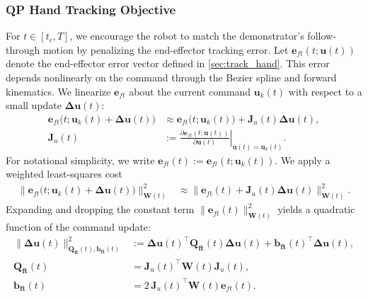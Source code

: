 \documentclass[conference]{IEEEtran}
\newcommand{\command}{\mathbf{u}}
\newcommand{\commandt}{\mathbf{u}(t)}
\newcommand{\commandupdate}{\mathbf{\Delta u}(t)}
\begin{document}
\subsubsection{QP Hand Tracking Objective}
\label{sec:track_hand_qp}
For $t \in [t_c, T]$, we encourage the robot to match the demonstrator's follow-through motion by penalizing the end-effector tracking error. Let $\mathbf{e}_{ft}(t;\commandt)$ denote the end-effector error vector defined in \cref{sec:track_hand}. This error depends nonlinearly on the command through the Bezier spline and forward kinematics. We linearize $\mathbf{e}_{ft}$ about the current command $\command_k(t)$ with respect to a small update $\commandupdate$:
\begin{align}
    \mathbf{e}_{ft}\bigl(t;\command_k(t) + \commandupdate\bigr)
    &\approx
    \mathbf{e}_{ft}\bigl(t;\command_k(t)\bigr) + \mathbf{J}_u(t)\commandupdate, \\
    \mathbf{J}_u(t) &:= \left.\frac{\partial \mathbf{e}_{ft}(t;\commandt)}{\partial \commandt}\right|_{\commandt=\command_k(t)}.
\end{align}
For notational simplicity, we write $\mathbf{e}_{ft}(t) := \mathbf{e}_{ft}(t;\command_k(t))$. We apply a weighted least-squares cost
\begin{align}
    \bigl\|\mathbf{e}_{ft}\bigl(t;\command_k(t) + \commandupdate\bigr)\bigr\|_{\mathbf{W}(t)}^{2}
    &\approx
    \bigl\|\mathbf{e}_{ft}(t) + \mathbf{J}_u(t)\commandupdate\bigr\|_{\mathbf{W}(t)}^{2}.
\end{align}
Expanding and dropping the constant term $\|\mathbf{e}_{ft}(t)\|_{\mathbf{W}(t)}^{2}$ yields a quadratic function of the command update:
\begin{align}
    \|\commandupdate\|_{\mathbf{Q_{ft}}(t),\mathbf{b_{ft}}(t)}^{2}
    &:= \commandupdate^\top \mathbf{Q_{ft}}(t)\commandupdate + \mathbf{b_{ft}}(t)^\top\commandupdate, \\
    \mathbf{Q_{ft}}(t) &= \mathbf{J}_u(t)^\top \mathbf{W}(t)\mathbf{J}_u(t), \\
    \mathbf{b_{ft}}(t) &= 2\,\mathbf{J}_u(t)^\top \mathbf{W}(t)\mathbf{e}_{ft}(t).
\end{align}
\end{document}
